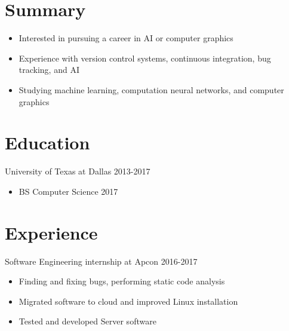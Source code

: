 \documentclass[line,margin]{res}
\begin{document}
	\address{10108 Tularosa Pass, Austin, TX 78726}
	\address{(512)574-6609 |
	\href{mailto:blakerandall0@gmail.com}{blakerandall0@gmail.com}}

\begin{resume}

\vspace{8pt}
\section{Summary}
\vspace{22pt}
	\begin{itemize} \itemsep -2pt
	\item Interested in pursuing a career in AI or computer graphics
	\item Experience with version control systems, continuous integration, bug tracking, and AI
	\item Studying machine learning, computation neural networks, and computer graphics
	\end{itemize}

\vspace{8pt}
\section{Education}
\vspace{12pt}
University of Texas at Dallas \hfill 2013-2017 \\
\vspace{-12pt}
	\begin{itemize} \itemsep -2pt
	\item BS Computer Science 2017
	\end{itemize}

\vspace{8pt}
\section{Experience}
\vspace{12pt}
Software Engineering internship at Apcon
\hfill 2016-2017
	\begin{itemize} \itemsep -2pt
	\item Finding and fixing bugs, performing static code analysis
	\item Migrated software to cloud and improved Linux installation
	\item Tested and developed Server software
	\end{itemize}

\vspace{8pt}

\end{resume}
\end{document}
